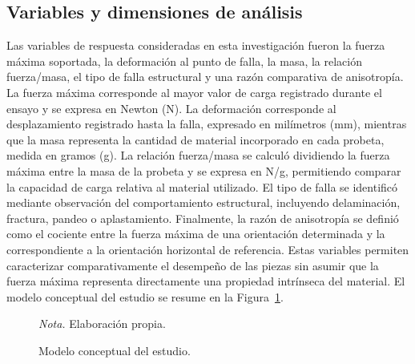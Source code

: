 \documentclass[10pt,twocolumn]{article}
\begin{document}
\subsection{Variables y dimensiones de análisis}
Las variables de respuesta consideradas en esta investigación fueron la fuerza máxima soportada, la deformación al punto de falla, la masa, la relación fuerza/masa, el tipo de falla estructural y una razón comparativa de anisotropía. La fuerza máxima corresponde al mayor valor de carga registrado durante el ensayo y se expresa en Newton (N). La deformación corresponde al desplazamiento registrado hasta la falla, expresado en milímetros (mm), mientras que la masa representa la cantidad de material incorporado en cada probeta, medida en gramos (g). La relación fuerza/masa se calculó dividiendo la fuerza máxima entre la masa de la probeta y se expresa en N/g, permitiendo comparar la capacidad de carga relativa al material utilizado. El tipo de falla se identificó mediante observación del comportamiento estructural, incluyendo delaminación, fractura, pandeo o aplastamiento. Finalmente, la razón de anisotropía se definió como el cociente entre la fuerza máxima de una orientación determinada y la correspondiente a la orientación horizontal de referencia. Estas variables permiten caracterizar comparativamente el desempeño de las piezas sin asumir que la fuerza máxima representa directamente una propiedad intrínseca del material. El modelo conceptual del estudio se resume en la Figura~\ref{fig:modelo}.
\begin{figure}[t]
\centering
{}
\caption{Modelo conceptual del estudio.}
\label{fig:modelo}
\par\footnotesize\textit{Nota.} Elaboración propia.
\end{figure}
\end{document}
